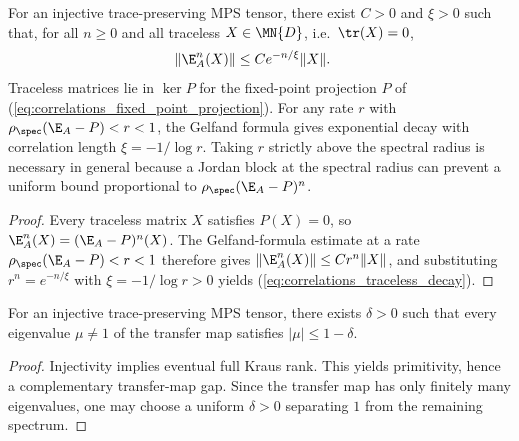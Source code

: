 \begin{theorem}\label{thm:correlation_length_bound}
    \leanok
    For an injective trace-preserving MPS tensor, there exist
    $C>0$ and $\xi>0$ such that, for all $n\ge 0$ and all
    traceless $X\in\MN{D}$, i.e.\ $\tr(X)=0$,
    \begin{align}
        \|\E_A^n(X)\|
         & \le C e^{-n/\xi}\|X\|.
        \label{eq:correlations_traceless_decay}
    \end{align}
    Traceless matrices lie in $\ker P$ for the fixed-point projection $P$ of
    (\ref{eq:correlations_fixed_point_projection}).
    For any rate $r$ with $\rho_{\spec}(\E_A-P)<r<1$, the Gelfand formula gives
    exponential decay with correlation length $\xi=-1/\log r$. Taking $r$
    strictly above the spectral radius is necessary in general because a Jordan
    block at the spectral radius can prevent a uniform bound proportional to
    $\rho_{\spec}(\E_A-P)^n$.
\end{theorem}

\begin{proof}
    \leanok
    Every traceless matrix $X$ satisfies $P(X)=0$, so
    $\E_A^n(X)=(\E_A-P)^n(X)$.
    The Gelfand-formula estimate at a rate
    $\rho_{\spec}(\E_A-P)<r<1$ therefore gives $\|\E_A^n(X)\|\le Cr^n\|X\|$,
    and substituting $r^n=e^{-n/\xi}$ with $\xi=-1/\log r>0$ yields
    (\ref{eq:correlations_traceless_decay}).
\end{proof}

\begin{lemma}%
    \label{thm:transfer_map_gap_wielandt}
    \leanok
    For an injective trace-preserving MPS tensor, there exists
    $\delta>0$ such that every eigenvalue $\mu\ne 1$ of the
    transfer map satisfies $|\mu|\le 1-\delta$.
\end{lemma}

\begin{proof}
    \leanok
    Injectivity implies eventual full Kraus rank. This yields primitivity,
    hence a complementary transfer-map gap. Since the transfer map has
    only finitely many eigenvalues, one may choose a uniform
    $\delta>0$ separating $1$ from the remaining spectrum.
\end{proof}

